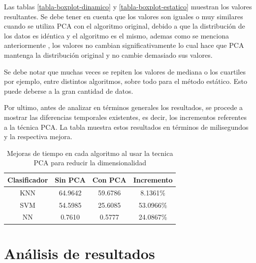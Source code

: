 Las tablas \ref{tabla-boxplot-dinamico}  y \ref{tabla-boxplot-estatico} muestran los valores resultantes. Se debe tener en cuenta que los valores son iguales o muy similares cuando se utiliza PCA con el algoritmo original, debido a que la distribución de los datos es idéntica y el algoritmo es el mismo, ademas como se menciona anteriormente , los valores no cambian significativamente lo cual hace que PCA mantenga la distribución original y no cambie demasiado sus valores.

Se debe notar que muchas veces se repiten los valores de mediana o los cuartiles por ejemplo, entre distintos algoritmos, sobre todo para el método estático. Esto puede deberse a la gran cantidad de datos.

Por ultimo, antes de analizar en términos generales los resultados, se procede a mostrar las diferencias temporales existentes, es decir, los incrementos referentes a la técnica PCA. La tabla muestra estos resultados en términos de milisegundos y la respectiva mejora.


\begin{table}[]
\centering
\caption{Mejoras de tiempo en cada algoritmo al usar la tecnica PCA para reducir la dimensionalidad}
\label{tiempo-tabla}
\begin{tabular}{|c|c|c|c|}
\hline
\textbf{Clasificador} & \textbf{Sin PCA} & \textbf{Con PCA} & \textbf{Incremento} \\ \hline
KNN                   & 64.9642          & 59.6786          & 8.1361\%            \\ \hline
SVM                   & 54.5985          & 25.6085          & 53.0966\%           \\ \hline
NN                    & 0.7610           & 0.5777           & 24.0867\%           \\ \hline
\end{tabular}
\end{table}


\section{Análisis de resultados}

